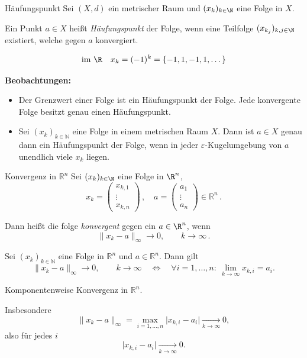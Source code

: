 \begin{definition}{Häufungspunkt}
    Sei $(X,d)$ ein metrischer Raum und $(x_k)_{k\in\N}$ eine Folge in $X$. 

    Ein Punkt $a \in X$ heißt \emph{Häufungspunkt} der Folge, wenn eine Teilfolge $(x_{k_j})_{k,j\in\N}$ existiert, welche gegen $a$ konvergiert.
\end{definition}

\begin{beispielbox}
    $$
        \text{im } \R \quad x_k = (-1)^k = \{-1,1,-1,1,\dots\}
    $$
\end{beispielbox}

\begin{bemerkungbox}
    \textbf{Beobachtungen:}
    \begin{itemize}
        \item Der Grenzwert einer Folge ist ein Häufungspunkt der Folge. Jede konvergente Folge besitzt genau einen Häufungspunkt.
        \item Sei $(x_k)_{k\in\mathbb{N}}$ eine Folge in einem metrischen Raum $X$. Dann ist $a\in X$ genau dann ein Häufungspunkt der Folge, wenn in jeder $\varepsilon$-Kugelumgebung von $a$ unendlich viele $x_k$ liegen.
    \end{itemize}
\end{bemerkungbox}

\begin{definition}{Konvergenz in $\mathbb{R}^n$}
    Sei $(x_k)_{k\in\N}$ eine Folge in $\R^n$,
     $$
     x_k =
        \begin{pmatrix}
        x_{k,1}\\
        \vdots \\
        x_{k,n}
        \end{pmatrix} \, ,
    \quad
    a =
        \begin{pmatrix}
        a_1 \\
        \vdots \\
        a_n
        \end{pmatrix}
        \in \mathbb{R}^n \, .
    $$ 

    Dann heißt die folge \emph{konvergent} gegen ein $a \in \R^n$, wenn
    $$
        \|x_k - a\|_\infty \to 0,\qquad k \to \infty \, .
    $$
\end{definition}

\begin{bemerkungbox}
    Sei $(x_k)_{k\in\mathbb{N}}$ eine Folge in $\mathbb{R}^n$ und $a\in\mathbb{R}^n$. Dann gilt
    $$
    \|x_k-a\|_{\infty}\to 0,\qquad k\to\infty
    \quad\Longleftrightarrow\quad
    \forall i=1,\dots,n:\ \lim_{k\to\infty} x_{k,i}=a_i.
    $$

    Komponentenweise Konvergenz in $\mathbb{R}^n$.

    Insbesondere
    $$
    \|x_k-a\|_{\infty}=\max_{i=1,\dots,n}\big|x_{k,i}-a_i\big|
    \xrightarrow[k\to\infty]{}0,
    $$
    also für jedes $i$
    $$
    \big|x_{k,i}-a_i\big|\xrightarrow[k\to\infty]{}0.
    $$
\end{bemerkungbox}

